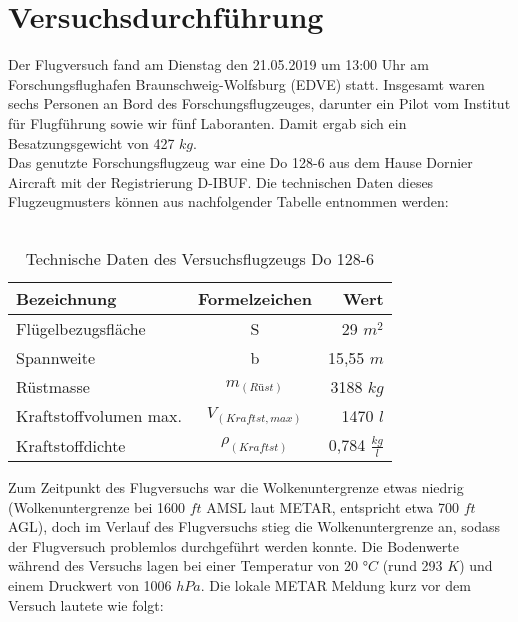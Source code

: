 \chapter{Versuchsdurchführung}
\label{chapter:versuch}
Der Flugversuch fand am  Dienstag den 21.05.2019 um 13:00 Uhr am Forschungsflughafen Braunschweig-Wolfsburg (EDVE) statt. Insgesamt waren sechs Personen an Bord des Forschungsflugzeuges, darunter ein Pilot vom Institut für Flugführung sowie wir fünf Laboranten. Damit ergab sich ein Besatzungsgewicht von 427 $kg$.\\
Das genutzte Forschungsflugzeug war eine Do 128-6 aus dem Hause Dornier Aircraft mit der Registrierung D-IBUF. Die technischen Daten dieses Flugzeugmusters können aus nachfolgender Tabelle entnommen werden:\\\\

\begin{table}[h]
	\centering
	\begin{tabular}{|l|c|r|}
		\hline
		\textbf{Bezeichnung}         	& \textbf{Formelzeichen} & \textbf{Wert}           		\\ \hline
		Flügelbezugsfläche           	& S                      & 29 $m^2$ 					\\ \hline
		Spannweite                   	& b                      & 15,55 $m$                 	\\ \hline
		Rüstmasse                    	& $m_(Rüst)$             & 3188 $kg$                 	\\ \hline
		Kraftstoffvolumen max. 			& $V_(Kraftst,max)$      & 1470 $l$            			\\ \hline
		Kraftstoffdichte             	& $\rho_(Kraftst)$       & 0,784 $\frac{kg}{l}$      	\\ \hline
	\end{tabular}
	\caption{Technische Daten des Versuchsflugzeugs Do 128-6}
\end{table}

\noindent Zum Zeitpunkt des Flugversuchs war die Wolkenuntergrenze etwas niedrig (Wolkenuntergrenze bei 1600 $ft$ AMSL laut METAR, entspricht etwa 700 $ft$ AGL), doch im Verlauf des Flugversuchs stieg die Wolkenuntergrenze an, sodass der Flugversuch problemlos durchgeführt werden konnte. Die Bodenwerte während des Versuchs lagen bei einer Temperatur von 20 $°C$ (rund 293 $K$) und einem Druckwert von 1006 $hPa$. Die lokale METAR Meldung kurz vor dem Versuch lautete wie folgt:\\\\

